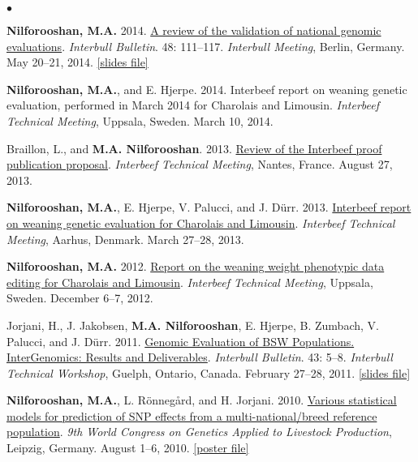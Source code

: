 \documentclass[margin,line]{res}
\newenvironment{list2}{
  \begin{list}{$\bullet$}{%
      \setlength{\itemsep}{0in}
      \setlength{\parsep}{0in} \setlength{\parskip}{0in}
      \setlength{\topsep}{0in} \setlength{\partopsep}{0in}
      \setlength{\leftmargin}{0.2in}}}{\end{list}}
\begin{document}
\begin{resume}
\begin{list2}
\item {\bf Nilforooshan, M.A.} 2014. \href{https://www.researchgate.net/publication/358198989_A_Review_of_the_Validation_of_National_Genomic_Evaluations}{A review of the validation of national genomic evaluations}. {\em Interbull Bulletin}. 48: 111--117. {\em Interbull Meeting}, Berlin, Germany. May 20--21, 2014. \href{https://drive.google.com/file/d/0B2l_izQwJmVpdmxrUjF5WGc1X3c/view?usp=sharing&resourcekey=0-OBCPGDhhf3PpkbQL_lwMXg}{[slides file]}
\item {\bf Nilforooshan, M.A.}, and E. Hjerpe. 2014. Interbeef report on weaning genetic evaluation, performed in March 2014 for Charolais and Limousin. {\em Interbeef Technical Meeting}, Uppsala, Sweden. March 10, 2014.
\item Braillon, L., and {\bf M.A. Nilforooshan}. 2013. \href{https://drive.google.com/file/d/0B2l_izQwJmVpYWE2VndwNGhJblU/view?usp=sharing&resourcekey=0-lK2OKh6je4O4Dz_z0I9jJg}{Review of the Interbeef proof publication proposal}. {\em Interbeef Technical Meeting}, Nantes, France. August 27, 2013.
\item {\bf Nilforooshan, M.A.}, E. Hjerpe, V. Palucci, and J. D\"{u}rr. 2013. \href{https://drive.google.com/file/d/0B2l_izQwJmVpZ2RRcXc0bS11RmM/view?usp=sharing&resourcekey=0-mJU9o7o9WqG3XXCrFYq9Xw}{Interbeef report on weaning genetic evaluation for Charolais and Limousin}. {\em Interbeef Technical Meeting}, Aarhus, Denmark. March 27--28, 2013.
\item {\bf Nilforooshan, M.A.} 2012. \href{https://drive.google.com/file/d/0B2l_izQwJmVpLVY5NU1UZGR6czA/view?usp=sharing&resourcekey=0-z2Uuf8hnh-P_CXmZJ6iNXw}{Report on the weaning weight phenotypic data editing for Charolais and Limousin}. {\em Interbeef Technical Meeting}, Uppsala, Sweden. December 6--7, 2012.
\item Jorjani, H., J. Jakobsen, {\bf M.A. Nilforooshan}, E. Hjerpe, B. Zumbach, V. Palucci, and J. D\"{u}rr. 2011. \href{https://www.researchgate.net/publication/265218200_Genomic_Evaluation_of_BSW_Populations_InterGenomics_Results_and_Deliverables}{Genomic Evaluation of BSW Populations. InterGenomics: Results and Deliverables}. {\em Interbull Bulletin}. 43: 5--8. {\em Interbull Technical Workshop}, Guelph, Ontario, Canada. February 27--28, 2011. \href{https://drive.google.com/file/d/0B2l_izQwJmVpbGh3ZC1iRWhCWVE/view?usp=sharing&resourcekey=0-BFevbAqrR4lVT5anezUffQ}{[slides file]}
\item {\bf Nilforooshan, M.A.}, L. R\"{o}nneg\r{a}rd, and H. Jorjani. 2010. \href{https://www.researchgate.net/publication/267973054_Various_Statistical_Models_For_Prediction_Of_SNP_Effects_From_A_Multi-NationalBreed_Reference_Population}{Various statistical models for prediction of SNP effects from a multi-national/breed reference population}. {\em 9th World Congress on Genetics Applied to Livestock Production}, Leipzig, Germany. August 1--6, 2010. \href{https://doi.org/10.13140/RG.2.2.36673.22881}{[poster file]}

\end{list2}
\end{resume}
\end{document}
